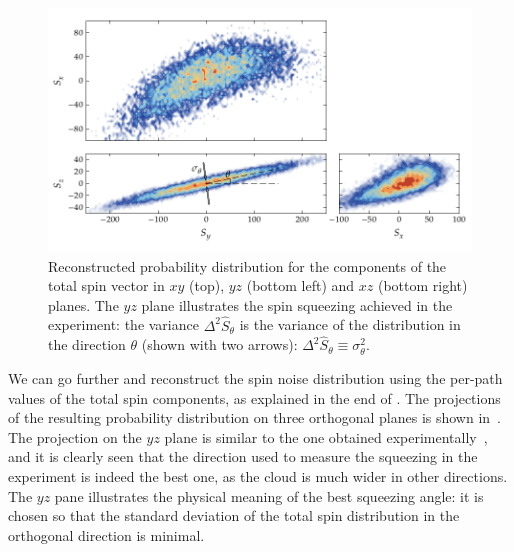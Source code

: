\begin{figure}
    \centerline{\includegraphics{figures_generated/bec_squeezing/riedel_cloud.pdf}}

    \caption{
    Reconstructed probability distribution for the components of the total spin vector in $xy$ (top), $yz$ (bottom left) and $xz$ (bottom right) planes.
    The $yz$ plane illustrates the spin squeezing achieved in the experiment: the variance $\Delta^2 \hat{S}_\theta$ is the variance of the distribution in the direction $\theta$ (shown with two arrows): $\Delta^2 \hat{S}_\theta \equiv \sigma_\theta^2$.}
    \label{fig:bec-squeezing:separation:cloud}
\end{figure}

We can go further and reconstruct the spin noise distribution using the per-path values of the total spin components, as explained in the end of .
The projections of the resulting probability distribution on three orthogonal planes is shown in~.
The projection on the $yz$ plane is similar to the one obtained experimentally~\cite{Riedel2010}, and it is clearly seen that the direction used to measure the squeezing in the experiment is indeed the best one, as the cloud is much wider in other directions.
The $yz$ pane illustrates the physical meaning of the best squeezing angle: it is chosen so that the standard deviation of the total spin distribution in the orthogonal direction is minimal.
